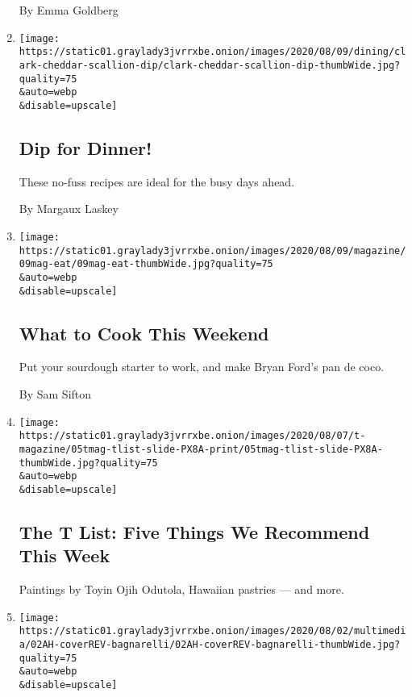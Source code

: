 \begin{enumerate}
  By Emma Goldberg
\item
  \href{/2020/08/07/dining/dip-for-dinner.html}{}

  \texttt{[image: https://static01.graylady3jvrrxbe.onion/images/2020/08/09/dining/clark-cheddar-scallion-dip/clark-cheddar-scallion-dip-thumbWide.jpg?quality=75\\\&auto=webp\\\&disable=upscale]}

  \hypertarget{dip-for-dinner}{%
  \subsection{Dip for Dinner!}\label{dip-for-dinner}}

  These no-fuss recipes are ideal for the busy days ahead.

  By Margaux Laskey
\item
  \href{/2020/08/07/dining/what-to-cook-this-weekend.html}{}

  \texttt{[image: https://static01.graylady3jvrrxbe.onion/images/2020/08/09/magazine/09mag-eat/09mag-eat-thumbWide.jpg?quality=75\\\&auto=webp\\\&disable=upscale]}

  \hypertarget{what-to-cook-this-weekend}{%
  \subsection{What to Cook This
  Weekend}\label{what-to-cook-this-weekend}}

  Put your sourdough starter to work, and make Bryan Ford's pan de coco.

  By Sam Sifton
\item
  \href{/2020/08/06/t-magazine/t-list-toyin-ojih-odutola.html}{}

  \texttt{[image: https://static01.graylady3jvrrxbe.onion/images/2020/08/07/t-magazine/05tmag-tlist-slide-PX8A-print/05tmag-tlist-slide-PX8A-thumbWide.jpg?quality=75\\\&auto=webp\\\&disable=upscale]}

  \hypertarget{the-t-list-five-things-we-recommend-this-week}{%
  \subsection{The T List: Five Things We Recommend This
  Week}\label{the-t-list-five-things-we-recommend-this-week}}

  Paintings by Toyin Ojih Odutola, Hawaiian pastries --- and more.
\item
  \href{/2020/08/05/at-home/newsletter.html}{}

  \texttt{[image: https://static01.graylady3jvrrxbe.onion/images/2020/08/02/multimedia/02AH-coverREV-bagnarelli/02AH-coverREV-bagnarelli-thumbWide.jpg?quality=75\\\&auto=webp\\\&disable=upscale]}


\end{enumerate}
